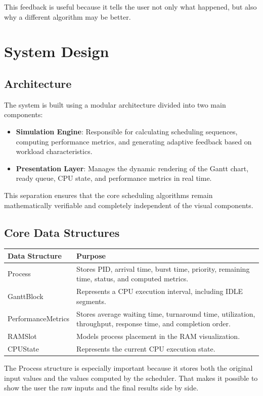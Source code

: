 \documentclass[12pt]{article}
\begin{document}
This feedback is useful because it tells the user not only what happened, but also why a different algorithm may be better.

\section{System Design}
\subsection{Architecture}
The system is built using a modular architecture divided into two main components:
\begin{itemize}[leftmargin=*]
    \item \textbf{Simulation Engine}: Responsible for calculating scheduling sequences, computing performance metrics, and generating adaptive feedback based on workload characteristics.
    \item \textbf{Presentation Layer}: Manages the dynamic rendering of the Gantt chart, ready queue, CPU state, and performance metrics in real time.
\end{itemize}

This separation ensures that the core scheduling algorithms remain mathematically verifiable and completely independent of the visual components.

\subsection{Core Data Structures}
\begin{longtable}{>{\raggedright\arraybackslash}p{} >{\raggedright\arraybackslash}p{}}
\toprule
\textbf{Data Structure} & \textbf{Purpose} \\
\midrule
Process & Stores PID, arrival time, burst time, priority, remaining time, status, and computed metrics. \\
GanttBlock & Represents a CPU execution interval, including IDLE segments. \\
PerformanceMetrics & Stores average waiting time, turnaround time, utilization, throughput, response time, and completion order. \\
RAMSlot & Models process placement in the RAM visualization. \\
CPUState & Represents the current CPU execution state. \\
\bottomrule
\end{longtable}

The Process structure is especially important because it stores both the original input values and the values computed by the scheduler. That makes it possible to show the user the raw inputs and the final results side by side.
\end{document}
